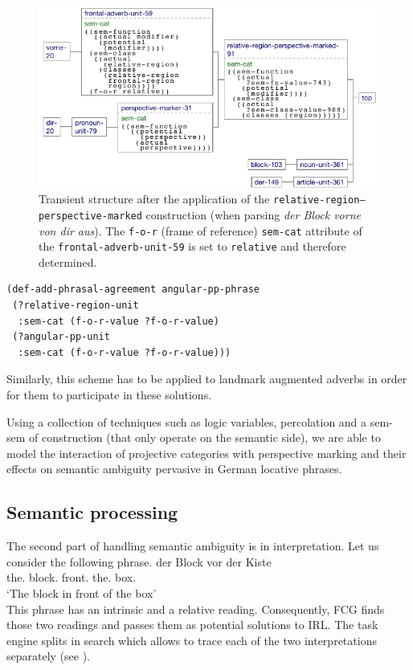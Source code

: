 \begin{figure}
\begin{center}
\includegraphics[width=0.8\columnwidth]{figs/perspective-marking-parsing-vorn-von-dir-aus-after} 
\caption[Transient structure after application]{Transient structure after the application 
of the {\footnotesize\tt relative-region--perspective-marked} construction
(when parsing \textit{der Block vorne von dir aus}). The {\footnotesize\tt f-o-r} (frame of reference) {\footnotesize\tt sem-cat} attribute of the 
{\footnotesize\tt frontal-adverb-unit-59} is set to {\footnotesize\tt relative} and therefore determined.}
\label{f:setting-f-o-r-after}
\end{center}
\end{figure}

\ea
\label{e:def-angular-pp-phrase-agreement}
\begin{lstlisting}
(def-add-phrasal-agreement angular-pp-phrase
 (?relative-region-unit
  :sem-cat (f-o-r-value ?f-o-r-value)
 (?angular-pp-unit
  :sem-cat (f-o-r-value ?f-o-r-value)))
\end{lstlisting}
\z
Similarly, this scheme has to be applied to landmark augmented adverbs in order for them to participate
in these solutions.

Using a collection of techniques such as logic variables, percolation and a sem-sem 
of construction (that only operate on the semantic side), we are able
to model the interaction of projective categories with perspective marking and their 
effects on semantic ambiguity pervasive in German locative phrases. 

\subsection{Semantic processing}
\label{s:semantic-ambiguity-semantic}
The second part of handling semantic ambiguity is in interpretation. 
Let us consider the following phrase.
\ea
\label{e:der-block-vor-der-kiste-repeated}
\gll der Block vor der Kiste \\
the.{\NOM} block.{\NOM} front.{\PREP} the.{\DAT} box.{\DAT} \\
\glt `The block in front of the box'\\
\z
This phrase has an intrinsic and a relative reading. Consequently, FCG finds
those two readings and passes them as potential solutions to IRL. 
The task engine splits in search which allows to trace each of the two interpretations
separately (see ).

